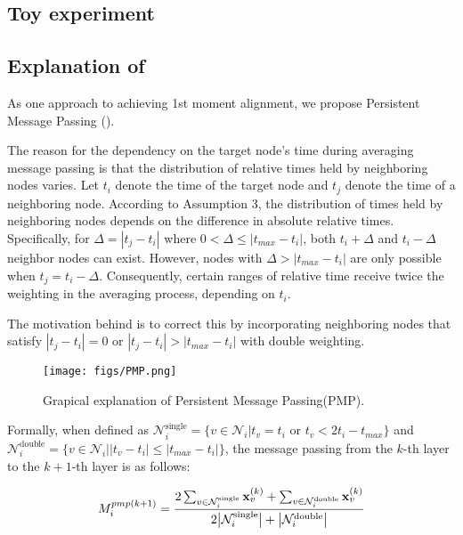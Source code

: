 \subsection{Toy experiment}
\label{apdx:toy_experiment}


\subsection{Explanation of \PMP}
\label{apdx:PMP}

As one approach to achieving 1st moment alignment, we propose Persistent Message Passing (\PMP).

The reason for the dependency on the target node's time during averaging message passing is that the distribution of relative times held by neighboring nodes varies. Let $t_i$ denote the time of the target node and $t_j$ denote the time of a neighboring node. According to Assumption 3, the distribution of times held by neighboring nodes depends on the difference in absolute relative times. Specifically, for $\Delta=  | t_j - t_i|$ where $0<\Delta \le | t_{max}-t_i|$, both $t_i + \Delta$ and $t_i - \Delta$ neighbor nodes can exist. However, nodes with $\Delta >|t_{max}-t_i|$ are only possible when $t_j=t_i-\Delta$. Consequently, certain ranges of relative time receive twice the weighting in the averaging process, depending on $t_i$.

The motivation behind \PMP is to correct this by incorporating neighboring nodes that satisfy $| t_j - t_i | =0$ or $| t_j - t_i | > | t_{max}-t_i |$ with double weighting.

\begin{figure}[hbt!]
	\vspace{-0.15in}
	\centering
	\texttt{[image: figs/PMP.png]}
	\vspace{-0.1in}
	\caption{Grapical explanation of Persistent Message Passing(PMP).}
	 \label{fig:PMP}
	 \vspace{-0.3in}
\end{figure}

Formally, when defined as $\mathcal{N}^{\text{single}}_i=\{v\in \mathcal{N}_i \big| t_v=t_i \text{ or }  t_v < 2t_i - t_{max} \}$ and $\mathcal{N}^{\text{double}}_i=\{v\in \mathcal{N}_i\big| | t_v-t_i|\le| t_{max} - t_i | \}$, the message passing from the $k$-th layer to the $k+1$-th layer is as follows:

\begin{align}
M_{i}^{pmp(k+1)} ={{2\sum_{v\in \mathcal{N}^{\text{single}}_i} \bold{x}_{v}^{(k)}+\sum_{v\in \mathcal{N}^{\text{double}}_i} \bold{x}_{v}^{(k)}}\over{2\big|\mathcal{N}^{\text{single}}_i\big| + \big|\mathcal{N}^{\text{double}}_i\big|}}
\end{align}


